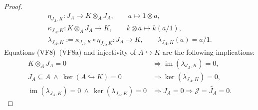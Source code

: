 \begin{proof}
  \[
  \begin{gathered}
    \eta_{J_A,K}\colon J_A\longrightarrow K\otimes_AJ_A,
    \qquad a\longmapsto1\otimes a,\\
    \kappa_{J_A,K}\colon K\otimes_AJ_A\longrightarrow K,
    \qquad k\otimes a\longmapsto k(a/1),\\
    \lambda_{J_A,K}:=\kappa_{J_A,K}\circ\eta_{J_A,K}
      \colon J_A\longrightarrow K,
    \qquad \lambda_{J_A,K}(a)=a/1.
  \end{gathered}                                                   \tag{VF8a}
  \]
  Equations (VF8)--(VF8a) and injectivity of $A\hookrightarrow K$ are the
  following implications:
  \[
  \begin{aligned}
    K\otimes_AJ_A=0
      &\Longrightarrow\operatorname{im}(\lambda_{J_A,K})=0,\\
    J_A\subseteq A\ \wedge\ \ker(A\hookrightarrow K)=0
      &\Longrightarrow\ker(\lambda_{J_A,K})=0,\\
    \operatorname{im}(\lambda_{J_A,K})=0\ \wedge\
      \ker(\lambda_{J_A,K})=0
      &\Longrightarrow J_A=0
       \Longrightarrow\mathcal J=\widetilde{J_A}=0.
  \end{aligned}                                                    \tag{VF9}
  \]


\end{proof}
